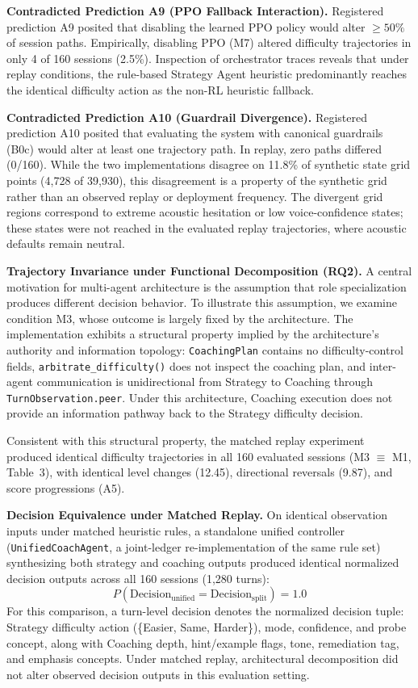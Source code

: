 \documentclass[runningheads]{llncs}
\begin{document}
\textbf{Contradicted Prediction A9 (PPO Fallback Interaction).} Registered prediction A9 posited that disabling the learned PPO policy would alter $\geq 50\%$ of session paths. Empirically, disabling PPO (M7) altered difficulty trajectories in only 4 of 160 sessions (2.5\%). Inspection of orchestrator traces reveals that under replay conditions, the rule-based Strategy Agent heuristic predominantly reaches the identical difficulty action as the non-RL heuristic fallback.

\textbf{Contradicted Prediction A10 (Guardrail Divergence).} Registered prediction A10 posited that evaluating the system with canonical guardrails (B0c) would alter at least one trajectory path. In replay, zero paths differed (0/160). While the two implementations disagree on 11.8\% of synthetic state grid points (4,728 of 39,930), this disagreement is a property of the synthetic grid rather than an observed replay or deployment frequency. The divergent grid regions correspond to extreme acoustic hesitation or low voice-confidence states; these states were not reached in the evaluated replay trajectories, where acoustic defaults remain neutral.

\textbf{Trajectory Invariance under Functional Decomposition (RQ2).} A central motivation for multi-agent architecture is the assumption that role specialization produces different decision behavior. To illustrate this assumption, we examine condition M3, whose outcome is largely fixed by the architecture. The implementation exhibits a structural property implied by the architecture's authority and information topology: \texttt{CoachingPlan} contains no difficulty-control fields, \texttt{arbitrate\_difficulty()} does not inspect the coaching plan, and inter-agent communication is unidirectional from Strategy to Coaching through \texttt{TurnObservation.peer}. Under this architecture, Coaching execution does not provide an information pathway back to the Strategy difficulty decision.

Consistent with this structural property, the matched replay experiment produced identical difficulty trajectories in all 160 evaluated sessions (M3 $\equiv$ M1, Table~3), with identical level changes (12.45), directional reversals (9.87), and score progressions (A5).

\textbf{Decision Equivalence under Matched Replay.} On identical observation inputs under matched heuristic rules, a standalone unified controller (\texttt{UnifiedCoachAgent}, a joint-ledger re-implementation of the same rule set) synthesizing both strategy and coaching outputs produced identical normalized decision outputs across all 160 sessions (1,280 turns):
\[
P(\mathrm{Decision}_{\mathrm{unified}} = \mathrm{Decision}_{\mathrm{split}}) = 1.0
\]
For this comparison, a turn-level decision denotes the normalized decision tuple: Strategy difficulty action (\{Easier, Same, Harder\}), mode, confidence, and probe concept, along with Coaching depth, hint/example flags, tone, remediation tag, and emphasis concepts. Under matched replay, architectural decomposition did not alter observed decision outputs in this evaluation setting.
\end{document}
